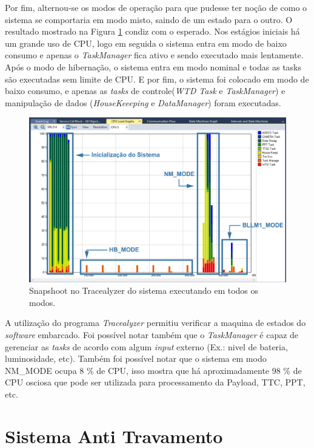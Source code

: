 \newpage
Por fim, alternou-se os modos de operação para que pudesse ter noção de como o sistema se comportaria em modo misto, saindo de um estado para o outro. O resultado mostrado na Figura \ref{trace_snapshoot_8} condiz com o esperado. Nos estágios iniciais há um grande uso de CPU, logo em seguida o sistema entra em modo de baixo consumo e apenas o \textit{TaskManager} fica ativo e sendo executado mais lentamente. Após o modo de hibernação, o sistema entra em modo nominal e todas as tasks são executadas sem limite de CPU. E por fim, o sistema foi colocado em modo de baixo consumo, e apenas as \textit{tasks} de controle(\textit{WTD Task} e \textit{TaskManager}) e manipulação de dados (\textit{HouseKeeeping} e \textit{DataManager}) foram executadas.

\begin{figure}[h]
	\centering
	\caption{Snapshoot no Tracealyzer do sistema executando em todos os modos.}
	\includegraphics[keepaspectratio=true,scale=0.51]{figuras/trace_snapshoot_8.PNG}
	
	\label{trace_snapshoot_8}
\end{figure}

A utilização do programa \textit{Tracealyzer} permitiu verificar a maquina de estados do \textit{software} embarcado. Foi possível notar também que o \textit{TaskManager} é capaz de gerenciar as \textit{tasks} de acordo com algum \textit{input} externo (Ex.: nivel de bateria, luminosidade, etc). Também foi possível notar que o sistema em modo NM\_MODE ocupa 8 \%  de CPU, isso mostra que há aproximadamente 98 \% de CPU osciosa que pode ser utilizada para processamento da Payload, TTC, PPT, etc.

\newpage
\section{Sistema Anti Travamento}

